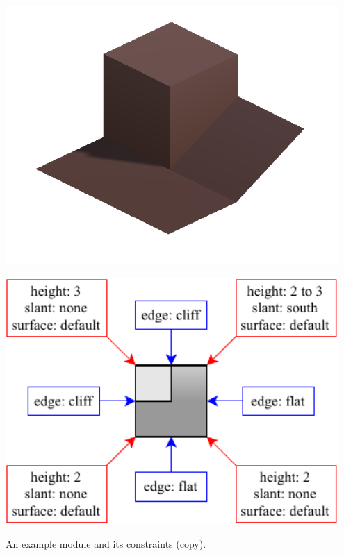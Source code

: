 \begin{center}
    \captionsetup{type=figure}
    \begin{minipage}{.5\textwidth}
        \centering
        \includegraphics[width=0.95\textwidth]{img/Module model.png}
    \end{minipage}%
    \begin{minipage}{.5\textwidth}
        \centering
        \includegraphics[width=0.95\textwidth]{img/Module constraints.pdf}
    \end{minipage}
    \caption{An example module and its constraints (copy).}
    \label{fig:wfc-module-2}
\end{center}

